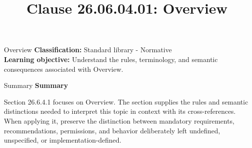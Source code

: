\documentclass[10pt,letterpaper]{article}
\title{Clause 26.06.04.01: Overview}
\author{}
\date{}
\begin{document}
\maketitle
\begin{CornellOverviewBox}{Overview}
\textbf{Classification:} Standard library - Normative\\[2pt]
\textbf{Learning objective:} Understand the rules, terminology, and semantic consequences associated with Overview.
\end{CornellOverviewBox}\begin{CornellSummaryBox}{Summary}
{\sffamily\bfseries\color{Accent} Summary}\par\vspace{3pt}Section 26.6.4.1 focuses on Overview. The section supplies the rules and semantic distinctions needed to interpret this topic in context with its cross-references. When applying it, preserve the distinction between mandatory requirements, recommendations, permissions, and behavior deliberately left undefined, unspecified, or implementation-defined.
\end{CornellSummaryBox}
\end{document}
